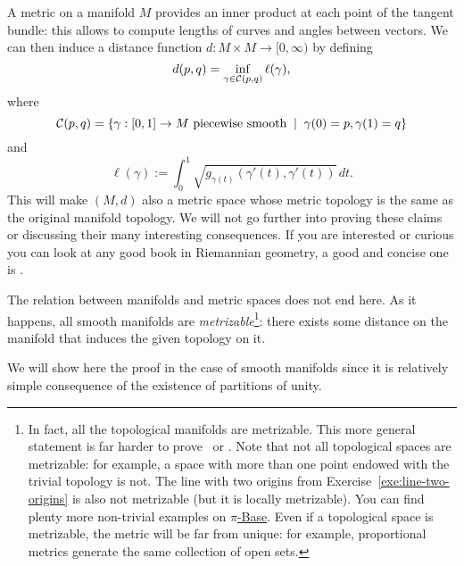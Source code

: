 A metric on a manifold $M$ provides an inner product at each point of the tangent bundle: this allows to compute lengths of curves and angles between vectors. We can then induce a distance function $d: M \times M \to [0, \infty)$ by defining
\begin{equation}
	d(p,q) = \inf_{\gamma \in \mathcal{C}(p,q)} \ell(\gamma),
\end{equation}
where
\begin{equation}
	\mathcal{C}(p,q) = \left\{\gamma : [0,1] \to M \mbox{ piecewise smooth} \;\mid\; \gamma(0)=p, \gamma(1)=q\right\}
\end{equation}
and
\begin{equation}
	\ell(\gamma) := \int_0^1 \sqrt{g_{\gamma(t)}(\gamma'(t), \gamma'(t))}\, dt.
\end{equation}
This will make $(M, d)$ also a metric space whose metric topology is the same as the original manifold topology.
We will not go further into proving these claims or discussing their many interesting consequences.
If you are interested or curious you can look at any good book in Riemannian geometry,
a good and concise one is \cite[Chapter 6]{book:lee:riemannian}.

The relation between manifolds and metric spaces does not end here. As it happens, all smooth manifolds are \emph{metrizable}\footnote{In fact, all the topological manifolds are metrizable. This more general statement is far harder to prove~\cite[Theorem 34.1 and Exercise 1 of Chapter 4.36]{book:munkres:topology} or \cite{nlab:urysohn_metrization_theorem}. Note that not all topological spaces are metrizable: for example, a space with more than one point endowed with the trivial topology is not. The line with two origins from Exercise~\ref{exe:line-two-origins} is also not metrizable (but it is locally metrizable). You can find plenty more non-trivial examples on \href{https://topology.pi-base.org/spaces?q=\%7EMetrizable}{$\pi$-Base}. Even if a topological space is metrizable, the metric will be far from unique: for example, proportional metrics generate the same collection of open sets.}: there exists some distance on the manifold that induces the given topology on it.

We will show here the proof in the case of smooth manifolds since it is relatively simple consequence of the existence of partitions of unity.

